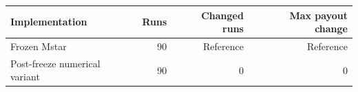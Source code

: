 \begin{tabular}{lrrr}
\toprule
Implementation & Runs & Changed runs & Max payout change \\
\midrule
Frozen Mstar & 90 & Reference & Reference \\
Post-freeze numerical variant & 90 & 0 & 0 \\
\bottomrule
\end{tabular}
